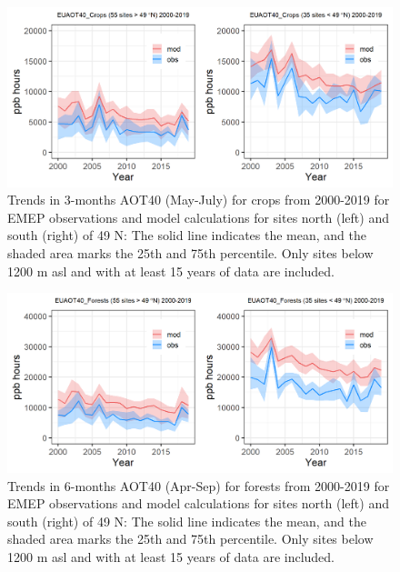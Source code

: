 \begin{figure}[h]
	\centering
	\includegraphics[width=0.74\paperwidth]{FIGS_TRENDS/EUAOT40_Crops_2000_2019_1200m.png}
	\caption{\label{fig:O3_aot40croptrends} Trends in 3-months AOT40 (May-July) for crops from 2000-2019 for EMEP observations and model calculations for sites north (left) and south (right) of 49 \degrees N: The solid line indicates the mean, and the shaded area marks the 25th and 75th percentile. Only sites below 1200 m asl and with at least 15 years of data are included.}
\end{figure}

\begin{figure}[h]
	\centering
	\includegraphics[width=0.74\paperwidth]{FIGS_TRENDS/EUAOT40_Forests_2000_2019_1200m.png}
	\caption{\label{fig:O3_aot40foresttrends}Trends in 6-months AOT40 (Apr-Sep) for forests from 2000-2019 for EMEP observations and model calculations for sites north (left) and south (right) of 49 \degrees N: The solid line indicates the mean, and the shaded area marks the 25th and 75th percentile. Only sites below 1200 m asl and with at least 15 years of data are included.}
\end{figure}


